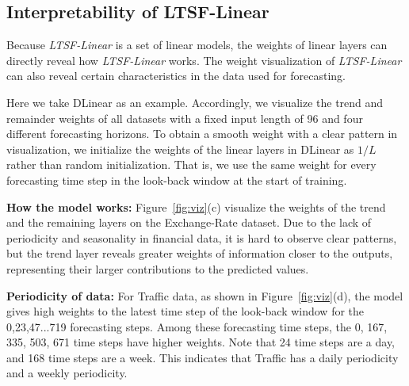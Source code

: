 \documentclass[10pt,twocolumn,letterpaper]{article}
\newcommand{\modelname}{\emph{LTSF-Linear}\xspace}
\begin{document}
\subsection{Interpretability of LTSF-Linear} 
Because \modelname is a set of linear models, the weights of linear layers can directly reveal how \modelname works. The weight visualization of \modelname can also reveal certain characteristics in the data used for forecasting.

Here we take DLinear as an example. Accordingly, we visualize the trend and remainder weights of all datasets with a fixed input length of 96 and four different forecasting horizons. To obtain a smooth weight with a clear pattern in visualization, we initialize the weights of the linear layers in DLinear as $1/L$ rather than random initialization. That is, we use the same weight for every forecasting time step in the look-back window at the start of training. 

\textbf{How the model works:} Figure~\ref{fig:viz}(c) visualize the weights of the trend and the remaining layers on the Exchange-Rate dataset. Due to the lack of periodicity and seasonality in financial data, it is hard to observe clear patterns, but the trend layer reveals greater weights of information closer to the outputs, representing their larger contributions to the predicted values.

\textbf{Periodicity of data:} For Traffic data, as shown in Figure~\ref{fig:viz}(d), the model gives high weights to the latest time step of the look-back window for the {0,23,47...719} forecasting steps. Among these forecasting time steps, the {0, 167, 335, 503, 671} time steps have higher weights. Note that 24 time steps are a day, and 168 time steps are a week. This indicates that Traffic has a daily periodicity and a weekly periodicity.
\end{document}
